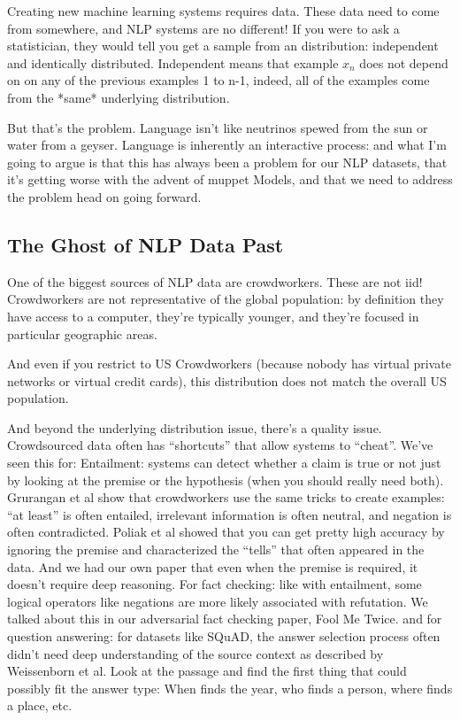 Creating new machine learning systems requires data.  These data need to come
from somewhere, and NLP systems are no different!  If you were to ask a
statistician, they would tell you get a sample from an \iid{} distribution:
independent and identically distributed.  Independent means that example
$x_{n}$ does not depend on on any of the previous examples 1 to n-1, indeed,
all of the examples come from the *same* underlying distribution.

But that’s the problem.  Language isn’t like neutrinos spewed from the sun or
water from a geyser.  Language is inherently an interactive process: and what
I’m going to argue is that this has always been a problem for our NLP
datasets, that it’s getting worse with the advent of muppet Models, and that
we need to address the problem head on going forward.

\subsection{The Ghost of NLP Data Past}

One of the biggest sources of NLP data are crowdworkers.  These are not iid!  Crowdworkers are not representative of the global population: by definition they have access to a computer, they’re typically younger, and they’re focused in particular geographic areas.

And even if you restrict to US Crowdworkers (because nobody has virtual private networks or virtual credit cards), this distribution does not match the overall US population.

And beyond the underlying distribution issue, there’s a quality issue.  Crowdsourced data often has “shortcuts” that allow systems to “cheat”.  We’ve seen this for:
Entailment: systems can detect whether a claim is true or not just by looking at the premise or the hypothesis (when you should really need both).  Grurangan et al show that crowdworkers use the same tricks to create examples: “at least” is often entailed, irrelevant information is often neutral, and negation is often contradicted.  Poliak et al showed that you can get pretty high accuracy by ignoring the premise and characterized the “tells” that often appeared in the data. And we had our own paper that even when the premise is required, it doesn’t require deep reasoning.
For fact checking: like with entailment, some logical operators like negations are more likely associated with refutation.  We talked about this in our adversarial fact checking paper, Fool Me Twice.
and for question answering: for datasets like SQuAD, the answer selection process often didn’t need deep understanding of the source context as described by Weissenborn et al.  Look at the passage and find the first thing that could possibly fit the answer type: When finds the year, who finds a person, where finds a place, etc.  

